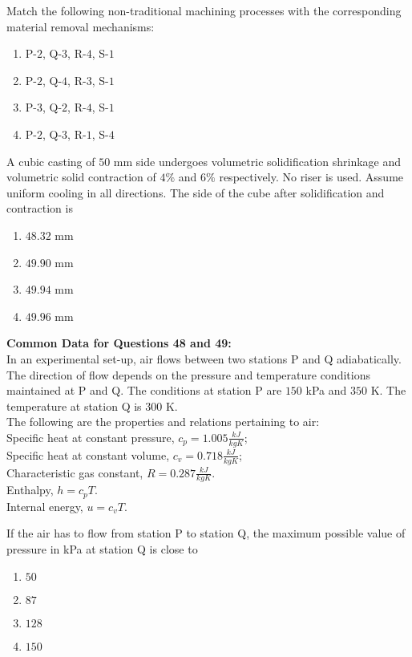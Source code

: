     \item Match the following non-traditional machining processes with the corresponding material removal mechanisms:
    

    
    \begin{enumerate}
        \item P-$2$, Q-$3$, R-$4$, S-$1$
        \item P-$2$, Q-$4$, R-$3$, S-$1$
        \item P-$3$, Q-$2$, R-$4$, S-$1$
        \item P-$2$, Q-$3$, R-$1$, S-$4$
    \end{enumerate}

    \item A cubic casting of $50$ mm side undergoes volumetric solidification shrinkage and volumetric solid contraction of $4\%$ and $6\%$ respectively. No riser is used. Assume uniform cooling in all directions. The side of the cube after solidification and contraction is
    \begin{enumerate}
        \item $48.32$ mm
        \item $49.90$ mm
        \item $49.94$ mm
        \item $49.96$ mm
    \end{enumerate}



\textbf{Common Data for Questions 48 and 49:}\\ 
In an experimental set-up, air flows between two stations P and Q adiabatically. The direction of flow depends on the pressure and temperature conditions maintained at P and Q. The conditions at station P are $150$ kPa and $350$ K. The temperature at station Q is $300$ K. \\
The following are the properties and relations pertaining to air: \\
Specific heat at constant pressure, $c_p = 1.005 \frac{ kJ}{kgK}$; \\
Specific heat at constant volume, $c_v = 0.718\frac{ kJ}{kgK}$; \\
Characteristic gas constant, $R = 0.287 \frac{kJ}{kgK}$. \\
Enthalpy, $h = c_p T$. \\
Internal energy, $u = c_v T$. 


    \item If the air has to flow from station P to station Q, the maximum possible value of pressure in kPa at station Q is close to
    \begin{enumerate}
        \item $50$
        \item $87$
        \item $128$
        \item $150$
    \end{enumerate}

